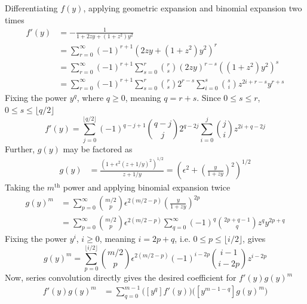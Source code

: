 \documentclass[a4paper]{amsart}
\begin{document}
Differentiating $f(y)$, applying geometric expansion and binomial expansion two times
\begin{align*}
f'(y)&=-\frac{1}{1+2zy+(1+z^2)y^2}\\
&=\sum_{r=0}^{\infty}(-1)^{r+1}\left(2zy+(1+z^2)y^2\right)^r\\
&=\sum_{r=0}^\infty(-1)^{r+1}\sum_{s=0}^r\binom{r}{s}(2zy)^{r-s}\left((1+z^2)y^2\right)^s\\
&=\sum_{r=0}^\infty(-1)^{r+1}\sum_{s=0}^r\binom{r}{s}2^{r-s}\sum_{i=0}^s\binom{s}{i}z^{2i+r-s}y^{r+s}
\end{align*}
Fixing the power $y^q$, where $q\geq 0$, meaning $q=r+s$. Since $0\leq s\leq r$, $0\leq s\leq \lfloor q/2\rfloor$
\begin{equation*}
[y^q]f'(y)=\sum_{j=0}^{\lfloor q/2\rfloor}(-1)^{q-j+1}\binom{q-j}{j}2^{q-2j}\sum_{i=0}^j\binom{j}{i}z^{2i+q-2j}
\end{equation*}
Further, $g(y)$ may be factored as
\begin{align*}
g(y)&=\frac{(1 + \epsilon^2(z+1/y)^2)^{1/2}}{z + 1/y}
=\left(\epsilon^2 + \left(\frac{y}{1+zy}\right)^2\right)^{1/2}
\end{align*}
Taking the $m^{\text{th}}$ power and applying binomial expansion twice
\begin{align*}
g(y)^m
&=\sum_{p=0}^\infty\binom{m/2}{p}\epsilon^{2(m/2-p)}\left(\frac{y}{1+zy}\right)^{2p}\\
&=\sum_{p=0}^\infty\binom{m/2}{p}\epsilon^{2(m/2-p)}\sum_{q=0}^\infty (-1)^q\binom{2p+q-1}{q}z^qy^{2p+q}
\end{align*}
Fixing the power $y^i$, $i\geq 0$, meaning $i=2p+q$, i.e. $0\leq p\leq \lfloor i/2\rfloor$, gives
\begin{equation*}
[y^i]g(y)^m=\sum_{p=0}^{\lfloor i/2\rfloor}\binom{m/2}{p}\epsilon^{2(m/2-p)}(-1)^{i-2p}\binom{i-1}{i-2p}z^{i-2p}
\end{equation*}
Now, series convolution directly gives the desired coefficient for $f'(y)g(y)^m$
\begin{align*}
[y^{m-1}]f'(y)g(y)^m&=\sum_{q=0}^{m-1}\big([y^q]f'(y)\big)\big([y^{m-1-q}]g(y)^m\big)
\end{align*}
\end{document}

